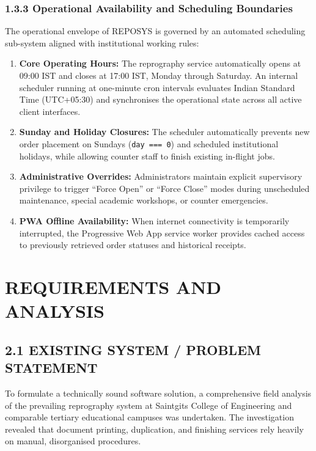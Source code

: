 \documentclass[12pt,a4paper,oneside]{report}
\begin{document}
\subsection{1.3.3 Operational Availability and Scheduling Boundaries}
The operational envelope of REPOSYS is governed by an automated scheduling sub-system aligned with institutional working rules:
\begin{enumerate}[leftmargin=0.35in, itemsep=2pt]
  \item \textbf{Core Operating Hours:} The reprography service automatically opens at 09:00 IST and closes at 17:00 IST, Monday through Saturday. An internal scheduler running at one-minute cron intervals evaluates Indian Standard Time (UTC+05:30) and synchronises the operational state across all active client interfaces.
  \item \textbf{Sunday and Holiday Closures:} The scheduler automatically prevents new order placement on Sundays (\texttt{day === 0}) and scheduled institutional holidays, while allowing counter staff to finish existing in-flight jobs.
  \item \textbf{Administrative Overrides:} Administrators maintain explicit supervisory privilege to trigger ``Force Open'' or ``Force Close'' modes during unscheduled maintenance, special academic workshops, or counter emergencies.
  \item \textbf{PWA Offline Availability:} When internet connectivity is temporarily interrupted, the Progressive Web App service worker provides cached access to previously retrieved order statuses and historical receipts.
\end{enumerate}

\chapter{REQUIREMENTS AND ANALYSIS}

\section{2.1 EXISTING SYSTEM / PROBLEM STATEMENT}
To formulate a technically sound software solution, a comprehensive field analysis of the prevailing reprography system at Saintgits College of Engineering and comparable tertiary educational campuses was undertaken. The investigation revealed that document printing, duplication, and finishing services rely heavily on manual, disorganised procedures.
\end{document}
